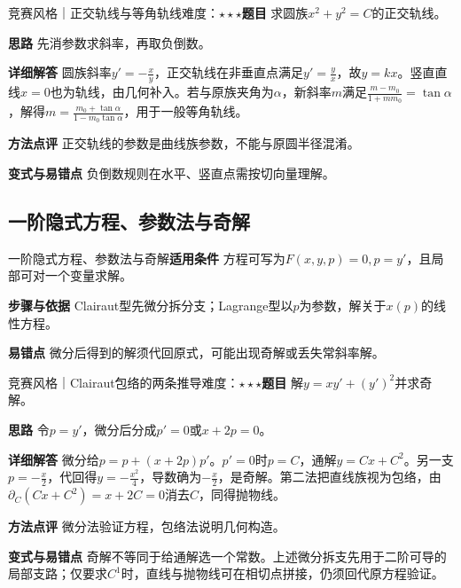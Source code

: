 \begin{example}{竞赛风格｜正交轨线与等角轨线}{难度：$\star\star\star$}\label{deep:ex:ode_source_deep:orthogonal}\textbf{题目} 求圆族$x^2+y^2=C$的正交轨线。\par\textbf{思路} 先消参数求斜率，再取负倒数。\par\textbf{详细解答} 圆族斜率$y'=-\frac{x}{y}$，正交轨线在非垂直点满足$y'=\frac{y}{x}$，故$y=kx$。竖直直线$x=0$也为轨线，由几何补入。若与原族夹角为$\alpha$，新斜率$m$满足$\frac{m-m_0}{1+mm_0}=\tan\alpha$，解得$m=\frac{m_0+\tan\alpha}{1-m_0\tan\alpha}$，用于一般等角轨线。\par\textbf{方法点评} 正交轨线的参数是曲线族参数，不能与原圆半径混淆。\par\textbf{变式与易错点} 负倒数规则在水平、竖直点需按切向量理解。\end{example}

\subsection{一阶隐式方程、参数法与奇解}\label{deep:ode_source_deep:implicit}

\begin{method}{一阶隐式方程、参数法与奇解}\textbf{适用条件} 方程可写为$F(x,y,p)=0,p=y'$，且局部可对一个变量求解。\par\textbf{步骤与依据} Clairaut型先微分拆分支；Lagrange型以$p$为参数，解关于$x(p)$的线性方程。\par\textbf{易错点} 微分后得到的解须代回原式，可能出现奇解或丢失常斜率解。\end{method}

\begin{example}{竞赛风格｜Clairaut包络的两条推导}{难度：$\star\star\star$}\label{deep:ex:ode_source_deep:clairaut}\textbf{题目} 解$y=xy'+(y')^2$并求奇解。\par\textbf{思路} 令$p=y'$，微分后分成$p'=0$或$x+2p=0$。\par\textbf{详细解答} 微分给$p=p+(x+2p)p'$。$p'=0$时$p=C$，通解$y=Cx+C^2$。另一支$p=-\frac{x}{2}$，代回得$y=-\frac{x^2}{4}$，导数确为$-\frac{x}{2}$，是奇解。第二法把直线族视为包络，由$\partial_C(Cx+C^2)=x+2C=0$消去$C$，同得抛物线。\par\textbf{方法点评} 微分法验证方程，包络法说明几何构造。\par\textbf{变式与易错点} 奇解不等同于给通解选一个常数。上述微分拆支先用于二阶可导的局部支路；仅要求$C^1$时，直线与抛物线可在相切点拼接，仍须回代原方程验证。\end{example}


